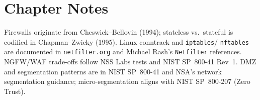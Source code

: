 \section*{Chapter Notes}
Firewalls originate from Cheswick--Bellovin (1994); stateless vs.\ stateful is
codified in Chapman--Zwicky (1995). Linux conntrack and \texttt{iptables}/
\texttt{nftables} are documented in \texttt{netfilter.org} and Michael Rash's
\texttt{Netfilter} references. NGFW/WAF trade-offs follow NSS Labs tests and
NIST SP~800-41 Rev~1. DMZ and segmentation patterns are in NIST SP~800-41 and
NSA's network segmentation guidance; micro-segmentation aligns with NIST
SP~800-207 (Zero Trust).
